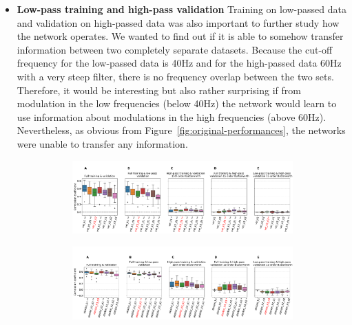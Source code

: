 \begin{itemize}
    \item \textbf{Low-pass training and high-pass validation}
    Training on low-passed data and validation on high-passed data was also important to further study how the network operates.
    We wanted to find out if it is able to somehow transfer information between two completely separate datasets.
    Because the cut-off frequency for the low-passed data is 40Hz and for the high-passed data 60Hz with a very steep filter, there is no frequency overlap between the two sets.
    Therefore, it would be interesting but also rather surprising if from modulation in the low frequencies (below 40Hz) the network would learn to use information about modulations in the high frequencies (above 60Hz).
    Nevertheless, as obvious from Figure~\ref{fig:original-performances}, the networks were unable to transfer any information.
    
\begin{figure}[!htpb]
\centering
\begin{subfigure}[b]{\textwidth}
   \includegraphics[width=1\linewidth]{img/ch4/original_setting_vel_performance_comparison}
   \caption{}
   \label{fig:original-performances-velocity} 
\end{subfigure}

\begin{subfigure}[b]{\textwidth}
   \includegraphics[width=1\linewidth]{img/ch4/original_setting_absVel_performance_comparison}
   \caption{}
   \label{fig:original-performances-absolute-velocity}
\end{subfigure}
\caption[]{}
\end{figure}\label{fig:original-performances}


\end{itemize}

